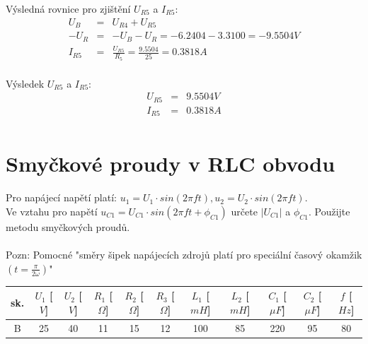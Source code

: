 \documentclass[a4paper,oneside,13pt]{article}
\begin{document}
	Výsledná rovnice pro zjištění $U_{R5}$ a $I_{R5}$:
	\begin{eqnarray*}
		U_{B} & = & U_{R4} + U_{R5} \\
		-U_{R} & = & -U_{B} - U_{R} = -6.2404 - 3.3100 = -9.5504V \\
		I_{R5} & = & \frac{U_{R5}}{R_{5}} = \frac{9.5504}{25} = 0.3818A\\
	\end{eqnarray*}

	Výsledek $U_{R5}$ a $I_{R5}$:
	\begin{eqnarray*}
		U_{R5} & = & 9.5504V \\
		I_{R5} & = & 0.3818A \\
	\end{eqnarray*}


	\newpage
	\section{Smyčkové proudy v RLC obvodu}

	Pro napájecí napětí platí: $u_{1} = U_{1}\cdot sin(2\pi ft), u_{2} = U_{2}\cdot sin(2\pi ft)$. \\
	Ve vztahu pro napětí $u_{C1} = U_{C1}\cdot sin(2\pi ft + \phi_{C1})$ určete $|U_{C1}|$ a $\phi_{C1}$. Použijte metodu smyčkových proudů.\\
	\\
	Pozn: Pomocné "směry šipek napájecích zdrojů platí pro speciální časový okamžik $(t = \frac{\pi}{2\omega})$"

	\begin{table}[h]
		\begin{center}
			\begin{tabular}{|c|c|c|c|c|c|c|c|c|c|c|}
				\hline
				sk. & $U_{1}$ [$V$] & $U_{2}$ [$V$] & $R_{1}$ [$\Omega$] & $R_{2}$ [$\Omega$] & $R_{3}$ [$\Omega$] & $L_{1}$ [$mH$] & $L_{2}$ [$mH$] & $C_{1}$ [$\mu F$] & $C_{2}$ [$\mu F$] & $f$ [$Hz$]\\
				\hline
				B &  25 & 40 & 11 & 15 & 12 & 100 & 85 & 220 & 95 & 80 \\
				\hline
			\end{tabular}
		\end{center}
	\end{table}
\end{document}
